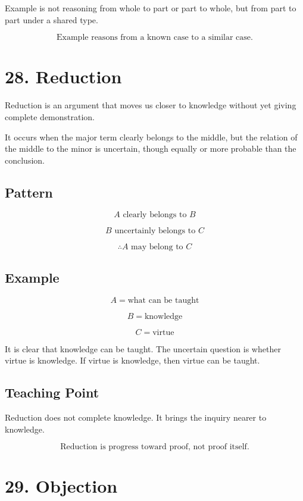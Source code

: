 \documentclass[12pt]{article}
\begin{document}
Example is not reasoning from whole to part or part to whole, but from part to
part under a shared type.

\[
\boxed{
\text{Example reasons from a known case to a similar case.}
}
\]

\section*{28. Reduction}

Reduction is an argument that moves us closer to knowledge without yet giving
complete demonstration.

It occurs when the major term clearly belongs to the middle, but the relation
of the middle to the minor is uncertain, though equally or more probable than
the conclusion.

\subsection*{Pattern}

\[
A \text{ clearly belongs to } B
\]

\[
B \text{ uncertainly belongs to } C
\]

\[
\therefore A \text{ may belong to } C
\]

\subsection*{Example}

\[
A = \text{what can be taught}
\]

\[
B = \text{knowledge}
\]

\[
C = \text{virtue}
\]

It is clear that knowledge can be taught. The uncertain question is whether
virtue is knowledge. If virtue is knowledge, then virtue can be taught.

\subsection*{Teaching Point}

Reduction does not complete knowledge. It brings the inquiry nearer to
knowledge.

\[
\boxed{
\text{Reduction is progress toward proof, not proof itself.}
}
\]

\section*{29. Objection}
\end{document}
